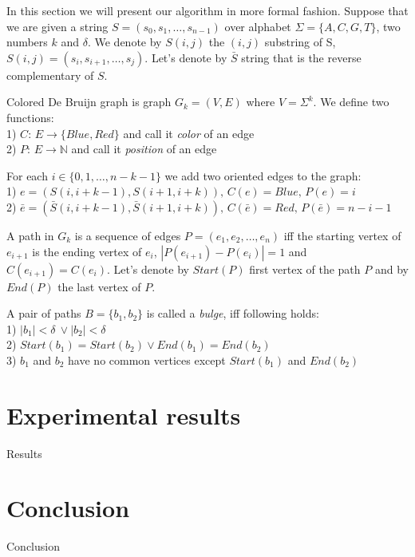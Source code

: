 \documentclass[a4paper,12pt]{scrartcl}
\begin{document}
In this section we will present our algorithm in more formal fashion. Suppose that we are given a string \(S = (s_{0}, s_{1}, \ldots, s_{n - 1})\)
over alphabet \(\Sigma = \lbrace A, C, G, T \rbrace\), two numbers \(k\) and \(\delta\). We denote by \(S(i, j)\) the \((i, j)\) substring of S,
\(S(i, j) = (s_{i}, s_{i + 1}, \ldots, s_{j}) \).  Let's denote by \(\bar{S}\) string that is the reverse complementary of \(S\). 

Colored De Bruijn graph is graph \(G_{k} = (V, E) \) where \(V = \Sigma ^ k \). We define two functions: \\
1) \(C: \, E \rightarrow \lbrace Blue, Red \rbrace \) and call it \textit{color} of an edge\\
2) \(P : \, E \rightarrow \mathbb{N} \) and call it \textit{position} of an edge

For each \(i \in \lbrace{0, 1, \ldots, n - k - 1} \rbrace \) we add two oriented edges to the graph: \\
1) \(e = (S(i, i + k - 1), S(i + 1, i + k)), \, C(e) = Blue, \, P(e) = i \) \\
2) \(\bar{e} = (\bar{S}(i, i + k - 1), \bar{S}(i + 1, i + k)), \, C(\bar{e}) = Red, \, P(\bar{e}) = n - i - 1 \)

A path in \(G_{k}\) is a sequence of edges \(P = (e_{1}, e_{2}, \ldots, e_{n})\) iff the starting vertex of \(e_{i + 1}\) is the ending
vertex of \(e_{i}\), \(|P(e_{i+1}) - P(e_{i})| = 1\) and \(C(e_{i + 1}) = C(e_{i})\). Let's denote by \(Start(P)\) first vertex of the
path \(P\) and by \(End(P)\) the last vertex of \(P\).

\newpage

A pair of paths \(B =\lbrace b_{1}, b_{2} \rbrace \)
is called a \textit{bulge}, iff following holds: \\
1) \(|b_{1}| < \delta\ \vee |b_{2}| < \delta\) \\
2) \(Start(b_{1}) = Start(b_{2}) \vee End(b_{1}) = End(b_{2}) \) \\
3) \(b_{1}\) and \(b_{2}\) have no common vertices except \(Start(b_{1})\) and \(End(b_{2})\)

\section{Experimental results}
Results
\section{Conclusion}
Conclusion
\end{document}
